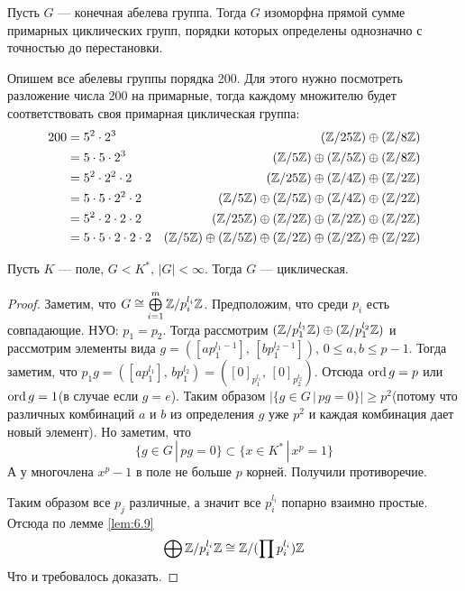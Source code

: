 \documentclass[../main.tex]{subfiles}
\begin{document}
\begin{theorem}
  Пусть $G$ --- конечная абелева группа. Тогда $G$ изоморфна прямой сумме примарных циклических групп, порядки которых определены однозначно с точностью до перестановки.
\end{theorem}
\begin{example}
  Опишем все абелевы группы порядка 200. Для этого нужно посмотреть разложение числа 200 на примарные, тогда каждому множителю будет соответствовать своя примарная циклическая группа:
  \begin{align*}
    200 &= 5^2 \cdot 2^3
        &(\mathbb{Z}/25\mathbb{Z}) \oplus (\mathbb{Z}/8\mathbb{Z})
        \\
        &= 5 \cdot 5 \cdot 2^3
        &(\mathbb{Z}/5\mathbb{Z}) \oplus (\mathbb{Z}/5\mathbb{Z}) \oplus (\mathbb{Z}/8\mathbb{Z})
        \\
        &= 5^2 \cdot 2^2 \cdot 2
        &(\mathbb{Z}/25\mathbb{Z}) \oplus (\mathbb{Z}/4\mathbb{Z}) \oplus (\mathbb{Z}/2\mathbb{Z})
        \\
        &= 5 \cdot 5 \cdot 2^2 \cdot 2
        &(\mathbb{Z}/5\mathbb{Z}) \oplus (\mathbb{Z}/5\mathbb{Z}) \oplus (\mathbb{Z}/4\mathbb{Z}) \oplus (\mathbb{Z}/2\mathbb{Z})
        \\
        &= 5^2 \cdot 2 \cdot 2 \cdot 2
        &(\mathbb{Z}/25\mathbb{Z}) \oplus (\mathbb{Z}/2\mathbb{Z}) \oplus (\mathbb{Z}/2\mathbb{Z}) \oplus (\mathbb{Z}/2\mathbb{Z})
        \\
        &= 5 \cdot 5 \cdot 2 \cdot 2 \cdot 2
        &(\mathbb{Z}/5\mathbb{Z}) \oplus (\mathbb{Z}/5\mathbb{Z}) \oplus (\mathbb{Z}/2\mathbb{Z}) \oplus (\mathbb{Z}/2\mathbb{Z}) \oplus (\mathbb{Z}/2\mathbb{Z})
  \end{align*}
\end{example}

\begin{corollary*}
  Пусть $K$ --- поле, $G < K^{*}, \, |G| < \infty$. Тогда $G$ --- циклическая.
\end{corollary*}
\begin{proof}
  Заметим, что $G \cong \bigoplus\limits_{i = 1}^{m} \mathbb{Z}/p_i^{l_i}\mathbb{Z}$. Предположим, что среди $p_i$ есть совпадающие. НУО: $p_1 = p_2$. Тогда рассмотрим $(\mathbb{Z}/p_1^{l_1}\mathbb{Z}) \oplus (\mathbb{Z}/p_1^{l_2}\mathbb{Z})$ и рассмотрим элементы вида $g = ([ap_1^{l_1 - 1}], \, [bp_1^{l_2 - 1}]), \, 0 \leq a, b \leq p - 1$. Тогда заметим, что $p_1 g = ([ap_1^{l_1}], \, bp_1^{l_2}) = ([0]_{p_1^{l_1}},\, [0]_{p_2^{l_2}})$. Отсюда $\operatorname{ord} g = p$ или $\operatorname{ord} g = 1$(в случае если $g = e$).
  Таким образом $ |\{g \in G \, | \, pg = 0\}| \geq p^2$(потому что различных комбинаций $a$ и $b$ из определения $g$ уже $p^2$ и каждая комбинация дает новый элемент). Но заметим, что
  \begin{equation*}
    \{g \in G \, | \, pg = 0\} \subset \{x \in K^{*} \, | \, x^p = 1\}
  \end{equation*}
  А у многочлена $x^p - 1$ в поле не больше $p$ корней. Получили противоречие.

  Таким образом все $p_j$ различные, а значит все $p_i^{l_i}$ попарно взаимно простые. Отсюда по лемме \ref{lem:6.9}
  \begin{equation*}
    \bigoplus \mathbb{Z}/p_{i}^{l_i}\mathbb{Z} \cong \mathbb{Z}/(\prod p_i^{l_i})\mathbb{Z}
  \end{equation*}
  Что и требовалось доказать.
\end{proof}
\end{document}
